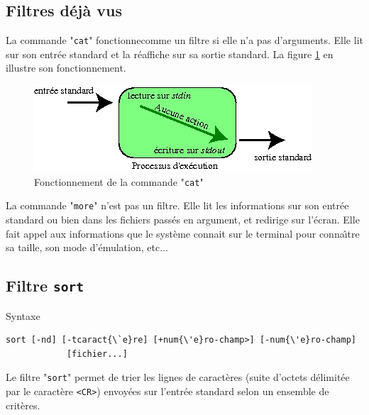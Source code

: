 {%
\subsection{Filtres d{\'e}j{\`a} vus}

La commande "{\tt  cat}" fonctionnecomme un filtre si elle n'a pas
d'arguments. Elle lit sur son entr{\'e}e standard et la r{\'e}affiche sur sa
sortie standard. La figure \ref{fig-cmds-cat} en illustre son fonctionnement.

\begin{figure}[hbtp]
\centering
\includegraphics{./_Images/cmds-unix/cat.jpg}
\caption{\label{fig-cmds-cat}Fonctionnement de la commande "{\tt cat}"}
\end{figure}

\begin{remarque}
La commande "{\tt more}" n'est pas un filtre. Elle lit les
informations sur son entr{\'e}e standard ou bien dans les fichiers pass{\'e}s en
argument, et redirige sur l'{\'e}cran. Elle fait appel aux informations que
le syst{\`e}me connait sur le terminal pour conna{\^\i}tre sa taille, son mode
d'{\'e}mulation, etc{...}
\end{remarque}

\subsection{Filtre {\tt sort}}

\begin{definition}{Syntaxe}
\begin{verbatim}
sort [-nd] [-tcaract{\`e}re] [+num{\'e}ro-champ>] [-num{\'e}ro-champ] 
            [fichier...]
\end{verbatim}
\end{definition}

Le filtre "{\tt sort}" permet de trier les lignes de caract{\`e}res (suite
d'octets d{\'e}limit{\'e}e par le caract{\`e}re \verb=<CR>=) envoy{\'e}es sur l'entr{\'e}e standard
selon un ensemble de crit{\`e}res.

}
